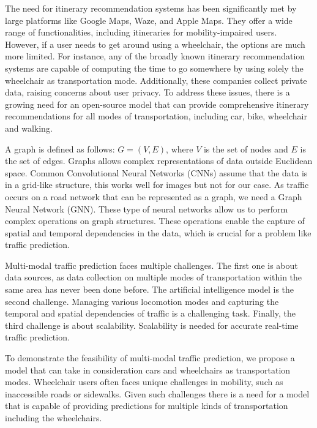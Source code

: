 The need for itinerary recommendation systems has been significantly met by large platforms like Google Maps, Waze, and
Apple Maps.
They offer a wide range of functionalities, including itineraries for mobility-impaired users.
However, if a user needs to get around using a wheelchair, the options are much more limited.
For instance, any of the broadly known itinerary recommendation systems are capable of computing the time to go
somewhere by using solely the wheelchair as transportation mode.
Additionally, these companies collect private data, raising concerns about user privacy.
To address these issues, there is a growing need for an open-source model that can provide comprehensive itinerary
recommendations for all modes of transportation, including car, bike, wheelchair and walking.
\vspace{1em}

A graph is defined as follows: $G = (V, E)$, where $V$ is the set of nodes and $E$ is the set of edges.
Graphs allows complex representations of data outside Euclidean space.
Common Convolutional Neural Networks (CNNs) assume that the data is in a grid-like structure, this works well for images
but not for our case.
As traffic occurs on a road network that can be represented as a graph, we need a Graph Neural Network (GNN).
These type of neural networks allow us to perform complex operations on graph structures.
These operations enable the capture of spatial and temporal dependencies in the data, which is crucial for a problem
like traffic prediction.
\vspace{1em}

Multi-modal traffic prediction faces multiple challenges.
The first one is about data sources, as data collection on multiple modes of transportation within the same area has
never been done before.
The artificial intelligence model is the second challenge.
Managing various locomotion modes and capturing the temporal and spatial dependencies of traffic is a challenging task.
Finally, the third challenge is about scalability.
Scalability is needed for accurate real-time traffic prediction.
\vspace{1em}

To demonstrate the feasibility of multi-modal traffic prediction, we propose a model that can take in consideration cars
and wheelchairs as transportation modes.
Wheelchair users often faces unique challenges in mobility, such as inaccessible roads or sidewalks.
Given such challenges there is a need for a model that is capable of providing predictions for multiple kinds of
transportation including the wheelchairs.
\vspace{1em}

